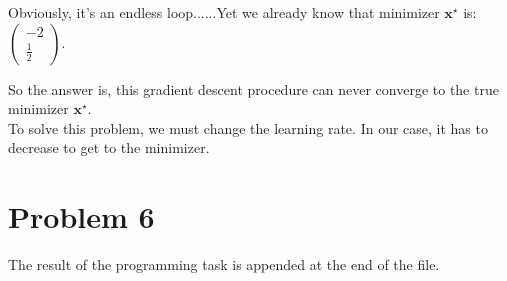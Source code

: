 \documentclass[12pt]{scrartcl}
\newcommand{\vect}[1]{\boldsymbol{#1}}
\newcommand{\ve}{\vect}
\begin{document}
\begin{enumerate}[label=\alph*)]
Obviously, it's an endless loop......Yet we already know that minimizer $\ve{x}^\star$ is:
$\begin{pmatrix}
         -2 \\
        \frac{1}{2} 
 \end{pmatrix}$.

So the answer is, this gradient descent procedure can never converge to the true minimizer $\ve{x}^\star$.\\
To solve this problem, we must change the learning rate. In our case, it has to decrease to get to the minimizer.
\end{enumerate}

    \section*{Problem 6}
The result of the programming task is appended at the end of the file.
\end{document}

